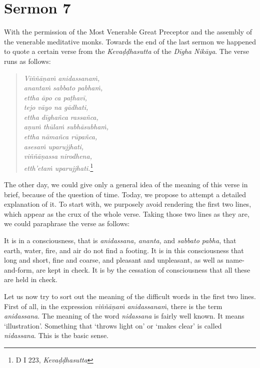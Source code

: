 \chapter{Sermon 7}

\NibbanaOpeningQuote

With the permission of the Most Venerable Great Preceptor and the assembly of the venerable meditative monks. Towards the end of the last sermon we happened to quote a certain verse from the \emph{Kevaḍḍhasutta} of the \emph{Dīgha Nikāya}. The verse runs as follows:

\begin{quote}
\emph{Viññāṇaṁ anidassanaṁ,}\\
\emph{anantaṁ sabbato pabhaṁ,}\\
\emph{ettha āpo ca paṭhavī,}\\
\emph{tejo vāyo na gādhati,}\\
\emph{ettha dīghañca rassañca,}\\
\emph{aṇuṁ thūlaṁ subhāsubhaṁ,}\\
\emph{ettha nāmañca rūpañca,}\\
\emph{asesaṁ uparujjhati,}\\
\emph{viññāṇassa nirodhena,}\\
\emph{etth'etaṁ uparujjhati.}\footnote{D I 223, \emph{Kevaḍḍhasutta}}
\end{quote}

The other day, we could give only a general idea of the meaning of this verse in brief, because of the question of time. Today, we propose to attempt a detailed explanation of it. To start with, we purposely avoid rendering the first two lines, which appear as the crux of the whole verse. Taking those two lines as they are, we could paraphrase the verse as follows:

It is in a consciousness, that is \emph{anidassana, ananta,} and \emph{sabbato pabha}, that earth, water, fire, and air do not find a footing. It is in this consciousness that long and short, fine and coarse, and pleasant and unpleasant, as well as name-and-form, are kept in check. It is by the cessation of consciousness that all these are held in check.

Let us now try to sort out the meaning of the difficult words in the first two lines. First of all, in the expression \emph{viññāṇaṁ anidassanaṁ}, there is the term \emph{anidassana}. The meaning of the word \emph{nidassana} is fairly well known. It means `illustration'. Something that `throws light on' or `makes clear' is called \emph{nidassana}. This is the basic sense.

